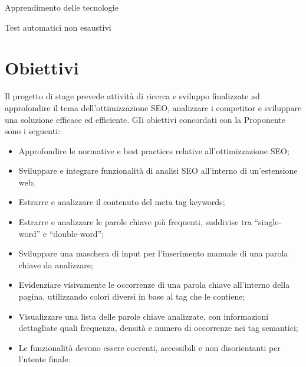 \begin{risk}{Apprendimento delle tecnologie}
  \label{risk:apprendimento-tecnologie} 
\end{risk}

\begin{risk}{Test automatici non esaustivi}
  \label{risk:test-automatici} 
\end{risk}

\section{Obiettivi}
\label{sec:obiettivi}

\par Il progetto di stage prevede attività di ricerca e sviluppo finalizzate ad approfondire il tema dell’ottimizzazione SEO, analizzare i competitor e sviluppare una soluzione efficace ed efficiente. GIi obiettivi concordati con la Proponente sono i seguenti:

\begin{itemize}
  \item Approfondire le normative e best practices relative all’ottimizzazione SEO;
  \item Sviluppare e integrare funzionalità di analisi SEO all’interno di un’estensione web;
  \item Estrarre e analizzare il contenuto del meta tag keywords;
  \item Estrarre e analizzare le parole chiave più frequenti, suddivise tra “single-word” e “double-word”;
  \item Sviluppare una maschera di input per l’inserimento manuale di una parola chiave da analizzare;
  \item Evidenziare visivamente le occorrenze di una parola chiave all’interno della pagina, utilizzando colori diversi in base al tag che le contiene;
  \item Visualizzare una lista delle parole chiave analizzate, con informazioni dettagliate quali frequenza, densità e numero di occorrenze nei tag semantici;
  \item Le funzionalità devono essere coerenti, accessibili e non disorientanti per l’utente finale.
\end{itemize}

